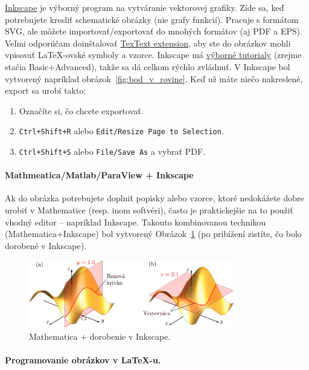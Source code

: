 \href{https://inkscape.org/}{Inkscape} je výborný program na vytváranie vektorovej grafiky. Zíde sa, keď potrebujete kresliť schematické obrázky (nie grafy funkcií). Pracuje s formátom SVG, ale môžete importovať/exportovať do mnohých formátov (aj PDF a EPS). Veľmi odporúčam doinštalovať \href{https://inkscape.org/~jcwinkler/%E2%98%85textext}{TexText extension}, aby ste do obrázkov mohli vpisovať LaTeX-ovské symboly a vzorce. Inkscape má \href{https://inkscape.org/learn/}{výborné tutorialy} (zrejme stačia Basic+Advanced), takže sa dá celkom rýchlo zvládnuť. V Inkscape bol vytvorený napríklad obrázok~\ref{fig:bod_v_rovine}. Keď už máte niečo nakreslené, export sa urobí takto:
\begin{enumerate}
	\item Označíte si, čo chcete exportovať.
	\item \verb|Ctrl+Shift+R| alebo \verb|Edit/Resize Page to Selection|.
	\item \verb|Ctrl+Shift+S| alebo \verb|File/Save As| a vybrať PDF. 
\end{enumerate}

\paragraph{Mathmeatica/Matlab/ParaView + Inkscape}

Ak do obrázka potrebujete doplniť popisky alebo vzorce, ktoré nedokážete dobre urobiť v Mathematice (resp. inom softvéri), často je praktickejšie na to použiť vhodný editor -- napríklad Inkscape. Takouto kombinovanou technikou (Mathematica+Inkscape) bol vytvorený Obrázok~\ref{fig:rezy} (po pribížení zistíte, čo bolo dorobené v Inkscape).
\begin{figure}[h]
	\centering
	\includegraphics[width=0.8\textwidth]{fig_rezy}
	\caption{Mathematica + dorobenie v Inkscape.} \label{fig:rezy}
\end{figure}


\paragraph{Programovanie obrázkov v LaTeX-u.}

